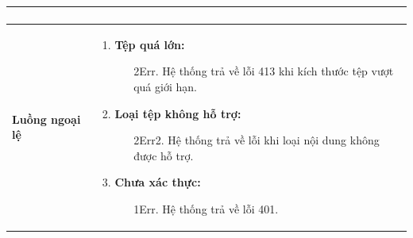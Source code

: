 {\begin{tabularx}{\textwidth}{|>{\raggedright\arraybackslash}p{3.5cm}|>{\raggedright\arraybackslash}X|}
\begin{enumerate}
\end{enumerate} \\
\hline
\textbf{Luồng ngoại lệ} &
\begin{enumerate}
    \item \textbf{Tệp quá lớn:}
    \begin{enumerate}
        \item[2Err.] Hệ thống trả về lỗi 413 khi kích thước tệp vượt quá giới hạn.
    \end{enumerate}
    \item \textbf{Loại tệp không hỗ trợ:}
    \begin{enumerate}
        \item[2Err2.] Hệ thống trả về lỗi khi loại nội dung không được hỗ trợ.
    \end{enumerate}
    \item \textbf{Chưa xác thực:}
    \begin{enumerate}
        \item[1Err.] Hệ thống trả về lỗi 401.
    \end{enumerate}
\end{enumerate} \\
\hline
\end{tabularx}
}
